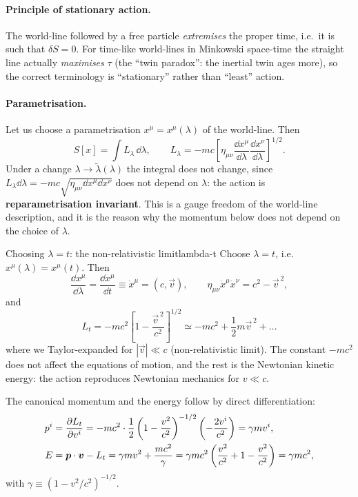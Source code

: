 \paragraph{Principle of stationary action.} The world-line followed by a free particle \emph{extremises} the proper time, i.e.\ it is such that $\delta S=0$. For time-like world-lines in Minkowski space-time the straight line actually \emph{maximises} $\tau$ (the ``twin paradox'': the inertial twin ages more), so the correct terminology is ``stationary'' rather than ``least'' action.

\paragraph{Parametrisation.} Let us choose a parametrisation $x^\mu=x^\mu(\lambda)$ of the world-line. Then
\begin{equation}
  S[x]=\int L_\lambda\,\dd\lambda,\qquad L_\lambda=-mc\left[\eta_{\mu\nu}\frac{\dd x^\mu}{\dd\lambda}\frac{\dd x^\nu}{\dd\lambda}\right]^{1/2}.
\end{equation}
Under a change $\lambda\to\tilde\lambda(\lambda)$ the integral does not change, since $L_\lambda\dd\lambda=-mc\sqrt{\eta_{\mu\nu}\dd x^\mu\dd x^\nu}$ does not depend on $\lambda$: the action is \textbf{reparametrisation invariant}. This is a gauge freedom of the world-line description, and it is the reason why the momentum below does not depend on the choice of $\lambda$.

\begin{example}{Choosing $\lambda=t$: the non-relativistic limit}{lambda-t}
Choose $\lambda=t$, i.e.\ $x^\mu(\lambda)=x^\mu(t)$. Then
\[
  \frac{\dd x^\mu}{\dd\lambda}=\frac{\dd x^\mu}{\dd t}\equiv\dot x^\mu=(c,\vec v),\qquad
  \eta_{\mu\nu}\dot x^\mu\dot x^\nu=c^2-\vec v^{\,2},
\]
and
\[
  L_t=-mc^2\left[1-\frac{\vec v^{\,2}}{c^2}\right]^{1/2}\simeq -mc^2+\frac12 m\vec v^{\,2}+\dots
\]
where we Taylor-expanded for $|\vec v|\ll c$ (non-relativistic limit). The constant $-mc^2$ does not affect the equations of motion, and the rest is the Newtonian kinetic energy: the action reproduces Newtonian mechanics for $v\ll c$.

The canonical momentum and the energy follow by direct differentiation:
\begin{align}
  p^i&=\frac{\partial L_t}{\partial v^i}=-mc^2\cdot\frac12\left(1-\frac{v^2}{c^2}\right)^{-1/2}\left(-\frac{2v^i}{c^2}\right)=\gamma m v^i,\\
  E&=\bm{p}\cdot\bm{v}-L_t=\gamma m v^2+\frac{mc^2}{\gamma}=\gamma mc^2\left(\frac{v^2}{c^2}+1-\frac{v^2}{c^2}\right)=\gamma mc^2,
\end{align}
with $\gamma\equiv(1-v^2/c^2)^{-1/2}$.
\end{example}

